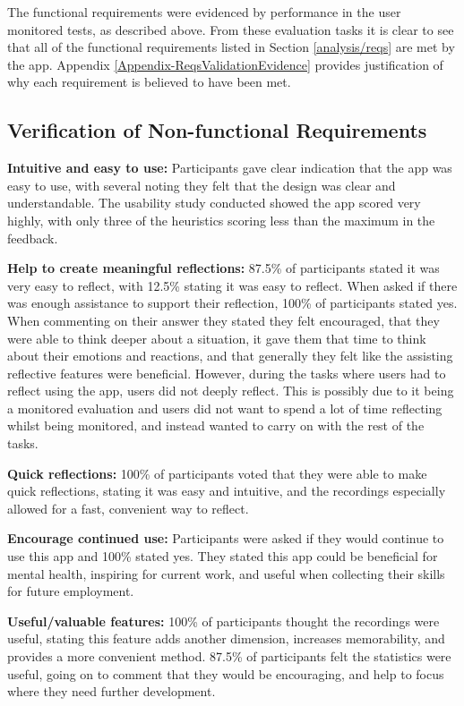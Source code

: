 \documentclass{l4proj}
\begin{document}
The functional requirements were evidenced by performance in the user monitored tests, as described above. From these evaluation tasks it is clear to see that all of the functional requirements listed in Section \ref{analysis/reqs} are met by the app. Appendix \ref{Appendix-ReqsValidationEvidence} provides justification of why each requirement is believed to have been met.

\subsection{Verification of Non-functional Requirements}

\textbf{Intuitive and easy to use:} Participants gave clear indication that the app was easy to use, with several noting they felt that the design was clear and understandable. The usability study conducted showed the app scored very highly, with only three of the heuristics scoring less than the maximum in the feedback. 

\textbf{Help to create meaningful reflections:} 87.5\% of participants stated it was very easy to reflect, with 12.5\% stating it was easy to reflect. When asked if there was enough assistance to support their reflection, 100\% of participants stated yes. When commenting on their answer they stated they felt encouraged, that they were able to think deeper about a situation, it gave them that time to think about their emotions and reactions, and that generally they felt like the assisting reflective features were beneficial. However, during the tasks where users had to reflect using the app, users did not deeply reflect. This is possibly due to it being a monitored evaluation and users did not want to spend a lot of time reflecting whilst being monitored, and instead wanted to carry on with the rest of the tasks.

\textbf{Quick reflections:} 100\% of participants voted that they were able to make quick reflections, stating it was easy and intuitive, and the recordings especially allowed for a fast, convenient way to reflect.

\textbf{Encourage continued use:} Participants were asked if they would continue to use this app and 100\% stated yes. They stated this app could be beneficial for mental health, inspiring for current work, and useful when collecting their skills for future employment. 

\textbf{Useful/valuable features:} 100\% of participants thought the recordings were useful, stating this feature adds another dimension, increases memorability, and provides a more convenient method. 87.5\% of participants felt the statistics were useful, going on to comment that they would be encouraging, and help to focus where they need further development.
\end{document}
